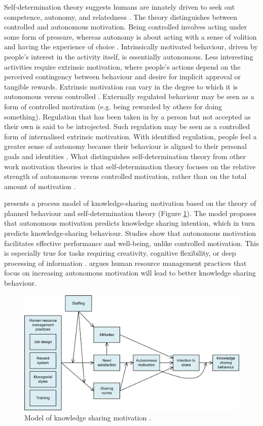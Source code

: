 Self-determination theory suggests humans are innately driven to seek out competence, autonomy, and relatedness \citep{deci1985general,ryan2000self}. The theory distinguishes between controlled and autonomous motivation. Being controlled involves acting under some form of pressure, whereas autonomy is about acting with a sense of volition and having the experience of choice \citep{gagne2005self}. Intrinsically motivated behaviour, driven by people’s interest in the activity itself, is essentially autonomous. Less interesting activities require extrinsic motivation, where people's actions depend on the perceived contingency between behaviour and desire for implicit approval or tangible rewards. Extrinsic motivation can vary in the degree to which it is autonomous versus controlled \citep{gagne2005self}. Externally regulated behaviour may be seen as a form of controlled motivation (e.g. being rewarded by others for doing something). Regulation that has been taken in by a person but not accepted as their own is said to be introjected. Such regulation may be seen as a controlled form of internalised extrinsic motivation. With identified regulation, people feel a greater sense of autonomy because their behaviour is aligned to their personal goals and identities \citep{gagne2005self}. What distinguishes self-determination theory from other work motivation theories is that self-determination theory focuses on the relative strength of autonomous versus controlled motivation, rather than on the total amount of motivation \citep{gagne2005self}. \medskip

\citet{gagne2009model} presents a process model of knowledge-sharing motivation based on the theory of planned behaviour and self-determination theory (Figure \ref{fig:gagnemodel}). The model proposes that autonomous motivation predicts knowledge sharing intention, which in turn predicts knowledge-sharing behaviour. Studies show that autonomous motivation facilitates effective performance and well-being, unlike controlled motivation. This is especially true for tasks requiring creativity, cognitive flexibility, or deep processing of information \citep{gagne2005self}. \citet{gagne2009model} argues human resource management practices that focus on increasing autonomous motivation will lead to better knowledge sharing behaviour. \medskip

\begin{figure}
	\centering
	\includegraphics[width=0.9\linewidth]{Images/gagne_model}
	\caption{Model of knowledge sharing motivation \citep{gagne2009model}.}
	\label{fig:gagnemodel}
\end{figure}

